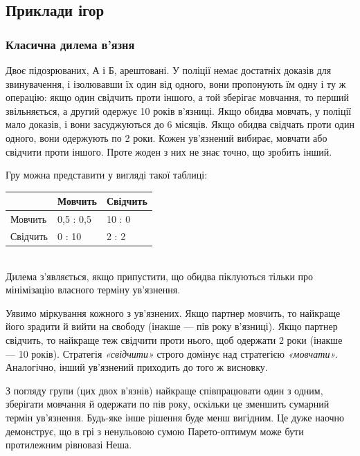 \documentclass[a4paper]{article}
\begin{document}
\subsection{Приклади ігор}
\subsubsection{Класична дилема в'язня}\label{prison}
Двоє підозрюваних, А і Б, арештовані. У поліції немає достатніх доказів для звинувачення, і ізолювавши їх один від одного, вони пропонують їм одну і ту ж операцію: якщо один свідчить проти іншого, а той зберігає мовчання, то перший звільняється, а другий одержує 10 років в'язниці. Якщо обидва мовчать, у поліції мало доказів, і вони засуджуються до 6 місяців. Якщо обидва свідчать проти один одного, вони одержують по 2 роки. Кожен ув'язнений вибирає, мовчати або свідчити проти іншого. Проте жоден з них не знає точно, що зробить інший.

Гру можна представити у вигляді такої таблиці:\\

\begin{tabular}{ | l | l | l | }
\hline
&Мовчить&Свідчить\\\hline
Мовчить&0,5 : 0,5&10 : 0\\\hline
Свідчить&0 : 10&2 : 2\\
\hline
\end{tabular}\\

Дилема з'являється, якщо припустити, що обидва піклуються тільки про мінімізацію власного терміну ув'язнення.

Уявимо міркування кожного з ув'язнених. Якщо партнер мовчить, то найкраще його зрадити й вийти на свободу (інакше — пів року в'язниці). Якщо партнер свідчить, то найкраще теж свідчити проти нього, щоб одержати 2 роки (інакше — 10 років). Стратегія \textit{«свідчити»} строго домінує над стратегією \textit{«мовчати»}. Аналогічно, інший ув'язнений приходить до того ж висновку.

З погляду групи (цих двох в'язнів) найкраще співпрацювати один з одним, зберігати мовчання й одержати по пів року, оскільки це зменшить сумарний термін ув'язнення. Будь-яке інше рішення буде менш вигідним. Це дуже наочно демонструє, що в грі з ненульовою сумою Парето-оптимум може бути протилежним рівновазі Неша.
\end{document}
